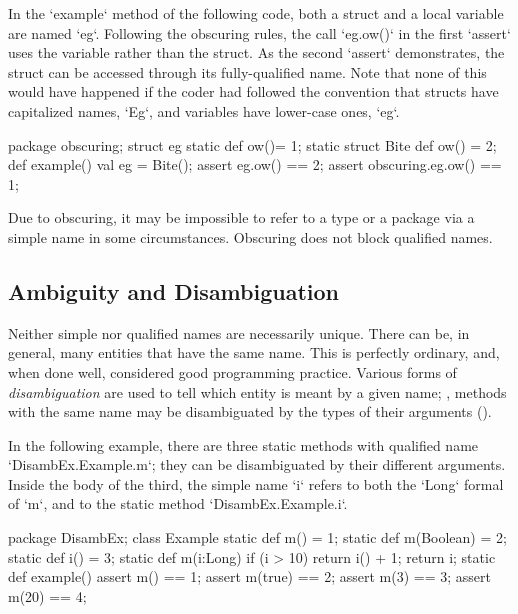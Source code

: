 \begin{ex}
In the \xcd`example` method of the following code, both a struct and a local
variable are named \xcd`eg`.  Following the obscuring rules, the call
\xcd`eg.ow()` in the first \xcd`assert` uses the variable rather than the struct.  
As the second \xcd`assert` demonstrates, the struct can be accessed through
its fully-qualified name.   Note that none of this would have happened if the
coder had followed the convention that structs have capitalized names,
\xcd`Eg`, and variables have lower-case ones, \xcd`eg`. 

% 
\begin{xten}
package obscuring;
struct eg {
   static def ow()= 1;
   static struct Bite {
      def ow() = 2;
   }
   def example() {
       val eg = Bite();
       assert eg.ow() == 2;
       assert obscuring.eg.ow() == 1;
     }
}

\end{xten}

\end{ex}

Due to obscuring, it may be impossible to refer to a type or a package via a
simple name in some circumstances.  Obscuring does not block qualified names.



\subsection{Ambiguity and Disambiguation}

Neither simple nor qualified names are necessarily unique.  There can be, in
general, many entities that have the same name.  This is perfectly ordinary,
and, when done well, considered good programming practice.   Various forms of
{\em disambiguation} are used to tell which entity is meant by a given name;
\eg, methods with the same name may be disambiguated by the types of their
arguments ().

\begin{ex}
In the following example, there are three static methods with 
qualified name \xcd`DisambEx.Example.m`; they can be disambiguated by their
different arguments.   Inside the body of the third, the simple name \xcd`i`
refers to both the \xcd`Long` formal of \xcd`m`, and to the static method 
\xcd`DisambEx.Example.i`.  
\begin{xten}
package DisambEx; 
class Example {
  static def m() = 1;
  static def m(Boolean) = 2;
  static def i() = 3;
  static def m(i:Long) {
    if (i > 10) {
      return i() + 1;
    }
    return i;
  }
  static def example() {
    assert m() == 1;
    assert m(true) == 2;
    assert m(3) == 3;
    assert m(20) == 4;
  }
}
\end{xten}
\end{ex}



